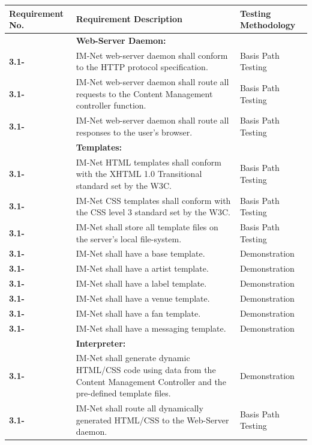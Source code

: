 \documentclass[letterpaper,12pt]{article}
\newcounter{rcounter}							%
\newcommand\rnumber{\stepcounter{rcounter}\arabic{rcounter}}
\begin{document}
{\begin{center}
\begin{tabular}{|l|p{4in}|p{2in}|}
\hline 
Requirement No. & Requirement Description  & Testing Methodology \\ 
\hline
& \textbf{Web-Server Daemon:} & \\
\hline
\textbf{3.1-\rnumber} & IM-Net web-server daemon shall conform to the HTTP protocol specification. & Basis Path Testing \\ 
\hline 
\textbf{3.1-\rnumber} & IM-Net web-server daemon shall route all requests to the Content Management controller function. & Basis Path Testing \\ 
\hline 
\textbf{3.1-\rnumber} & IM-Net web-server daemon shall route all responses to the user's browser. & Basis Path Testing \\ 
\hline  
& \textbf{Templates:} & \\
\hline
\textbf{3.1-\rnumber} & IM-Net HTML templates shall conform with the XHTML 1.0 Transitional standard set by the W3C. & Basis Path Testing \\ 
\hline 
\textbf{3.1-\rnumber} & IM-Net CSS templates shall conform with the CSS level 3 standard set by the W3C. & Basis Path Testing \\ 
\hline 
\textbf{3.1-\rnumber} & IM-Net shall store all template files on the server's local file-system. & Basis Path Testing \\
\hline
\textbf{3.1-\rnumber} & IM-Net shall have a base template. & Demonstration \\ 
\hline 
\textbf{3.1-\rnumber} & IM-Net shall have a artist template. & Demonstration \\ 
\hline 
\textbf{3.1-\rnumber} & IM-Net shall have a label template. & Demonstration \\ 
\hline 
\textbf{3.1-\rnumber} & IM-Net shall have a venue template. & Demonstration \\ 
\hline 
\textbf{3.1-\rnumber} & IM-Net shall have a fan template. & Demonstration \\ 
\hline 
\textbf{3.1-\rnumber} & IM-Net shall have a messaging template. & Demonstration \\ 
\hline 
& \textbf{Interpreter:} & \\
\hline
\textbf{3.1-\rnumber} & IM-Net shall generate dynamic HTML/CSS code using data from the Content Management Controller and the pre-defined template files. & Demonstration \\ 
\hline 
\textbf{3.1-\rnumber} & IM-Net shall route all dynamically generated HTML/CSS to the Web-Server daemon. &  Basis Path Testing \\ 
\hline 


\end{tabular}
\end{center}}
\end{document}
